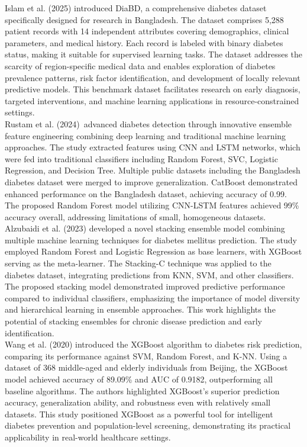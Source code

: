 \documentclass[conference, letterpaper]{IEEEtran}
\begin{document}
Islam et al. (2025) introduced DiaBD, a comprehensive diabetes dataset specifically designed for research in Bangladesh\cite{islam2025diabd}. The dataset comprises 5,288 patient records with 14 independent attributes covering demographics, clinical parameters, and medical history. Each record is labeled with binary diabetes status, making it suitable for supervised learning tasks. The dataset addresses the scarcity of region-specific medical data and enables exploration of diabetes prevalence patterns, risk factor identification, and development of locally relevant predictive models. This benchmark dataset facilitates research on early diagnosis, targeted interventions, and machine learning applications in resource-constrained settings.\\

Rustam et al. (2024)\ advanced diabetes detection through innovative ensemble feature engineering combining deep learning and traditional machine learning approaches\cite{rustam2024enhanced}. The study extracted features using CNN and LSTM networks, which were fed into traditional classifiers including Random Forest, SVC, Logistic Regression, and Decision Tree. Multiple public datasets including the Bangladesh diabetes dataset were merged to improve generalization. CatBoost demonstrated enhanced performance on the Bangladesh dataset, achieving accuracy of 0.99. The proposed Random Forest model utilizing CNN-LSTM features achieved 99\% accuracy overall, addressing limitations of small, homogeneous datasets.\\

Alzubaidi et al. (2023) developed a novel stacking ensemble model combining multiple machine learning techniques for diabetes mellitus prediction\cite{alzubaidi2023towards}. The study employed Random Forest and Logistic Regression as base learners, with XGBoost serving as the meta-learner. The Stacking-C technique was applied to the diabetes dataset, integrating predictions from KNN, SVM, and other classifiers. The proposed stacking model demonstrated improved predictive performance compared to individual classifiers, emphasizing the importance of model diversity and hierarchical learning in ensemble approaches. This work highlights the potential of stacking ensembles for chronic disease prediction and early identification.\\

Wang et al. (2020) introduced the XGBoost algorithm to diabetes risk prediction, comparing its performance against SVM, Random Forest, and K-NN\cite{wang2020prediction}. Using a dataset of 368 middle-aged and elderly individuals from Beijing, the XGBoost model achieved accuracy of 89.09\% and AUC of 0.9182, outperforming all baseline algorithms. The authors highlighted XGBoost's superior prediction accuracy, generalization ability, and robustness even with relatively small datasets. This study positioned XGBoost as a powerful tool for intelligent diabetes prevention and population-level screening, demonstrating its practical applicability in real-world healthcare settings.\\
\end{document}
